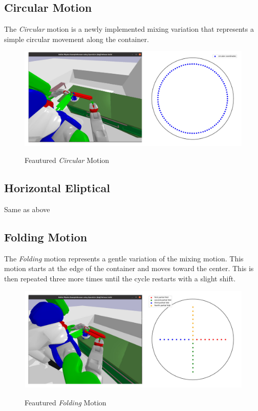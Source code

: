 \subsection{Circular Motion}
The \textit{Circular} motion is a newly implemented mixing variation that represents a simple circular movement along the container.
\begin{figure}[H]
    \includegraphics[scale=0.3]{Graphics/circular_showcase.jpg}
    \label{fig:whirlstormshowcase}
    \caption{Feautured \textit{Circular} Motion}
\end{figure}
\subsection{Horizontal Eliptical}
Same as above

\subsection{Folding Motion}
The \textit{Folding} motion represents a gentle variation of the mixing motion. This motion starts at the edge of the container and moves toward the center. This is then repeated three more times until the cycle restarts with a slight shift.
\begin{figure}[H]
    \includegraphics[scale=0.3]{Graphics/folding_showcase.jpg}
    \label{fig:whirlstormshowcase}
    \caption{Feautured \textit{Folding} Motion}
\end{figure}

